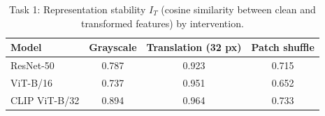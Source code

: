 \documentclass{article}
\begin{document}
\begin{table}[h]
\centering
\caption{Task 1: Representation stability $I_T$ (cosine similarity between clean and transformed features) by intervention.}
\label{tab:t1-rep-stability}
\begin{tabular}{lccc}
\toprule
Model & Grayscale & Translation (32 px) & Patch shuffle \\
\midrule
ResNet-50     & 0.787 & 0.923 & 0.715 \\
ViT-B/16       & 0.737 & 0.951 & 0.652 \\
CLIP ViT-B/32  & 0.894 & 0.964 & 0.733 \\
\bottomrule
\end{tabular}
\end{table}

\newpage


\end{document}
